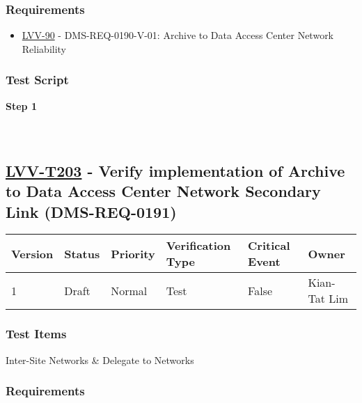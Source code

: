 \hypertarget{requirements-102}{%
\subsubsection{Requirements}\label{requirements-102}}

\begin{itemize}
\tightlist
\item
  \href{https://jira.lsstcorp.org/browse/LVV-90}{LVV-90} -
  DMS-REQ-0190-V-01: Archive to Data Access Center Network Reliability
\end{itemize}

\hypertarget{test-script-102}{%
\subsubsection{Test Script}\label{test-script-102}}

\textbf{Step 1}\\
~\\
~\\

\hypertarget{lvv-t203---verify-implementation-of-archive-to-data-access-center-network-secondary-link-dms-req-0191}{%
\subsection{\texorpdfstring{\href{https://jira.lsstcorp.org/secure/Tests.jspa\#/testCase/LVV-T203}{LVV-T203}
- Verify implementation of Archive to Data Access Center Network
Secondary Link
(DMS-REQ-0191)}{LVV-T203 - Verify implementation of Archive to Data Access Center Network Secondary Link (DMS-REQ-0191)}}\label{lvv-t203---verify-implementation-of-archive-to-data-access-center-network-secondary-link-dms-req-0191}}

\begin{longtable}[]{@{}llllll@{}}
\toprule
Version & Status & Priority & Verification Type & Critical Event &
Owner\tabularnewline
\midrule
\endhead
1 & Draft & Normal & Test & False & Kian-Tat Lim\tabularnewline
\bottomrule
\end{longtable}

\hypertarget{test-items-103}{%
\subsubsection{Test Items}\label{test-items-103}}

Inter-Site Networks \& Delegate to Networks

\hypertarget{requirements-103}{%
\subsubsection{Requirements}\label{requirements-103}}

